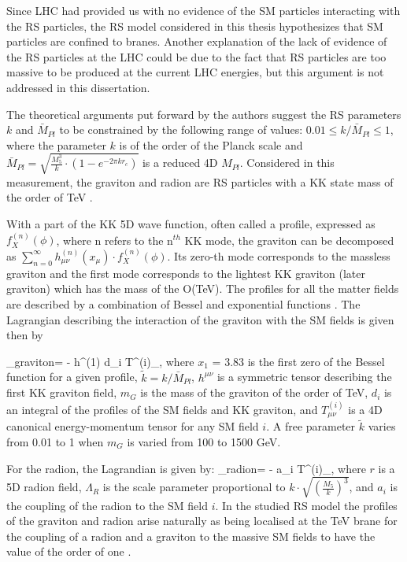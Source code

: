 Since LHC had provided us with no evidence of the SM particles interacting with the RS particles, the RS model considered in this thesis hypothesizes that SM particles are confined to branes. Another explanation of the lack of evidence of the RS particles at the LHC could be due to the fact that RS particles are too massive to be produced at the current LHC energies, but this argument is not addressed in this dissertation. 


The theoretical arguments put forward by the authors \cite{Davoudiasl:1999jd} suggest the RS parameters $k$ and $\bar{M}_{Pl}$ to be constrained by the following range of values: $0.01 \leq k / \bar{M}_{Pl} \leq 1$, where the parameter $k$ is of the order of the Planck scale and $\bar{M}_{Pl} = \sqrt{\frac{M^3_5}{k} \cdot (1 - e^{-2\pi k r_c} ) }$ is a reduced 4D $M_{Pl}$. Considered in this measurement, the graviton and radion are RS particles with a KK state mass of the order of TeV \cite{Oliveira:2014kla}. 

With a part of the KK 5D wave function, often called a profile, expressed as $f^{(n)}_X(\phi)$, where n refers to the n$^{th}$ KK mode, the graviton can be decomposed as $\sum_{n=0}^{\infty} h^{(n)}_{\mu\nu}(x_\mu) \cdot f^{(n)}_X(\phi)$. Its zero-th mode corresponds to the massless graviton and the first mode corresponds to the lightest KK graviton (later graviton) which has the mass of the O(TeV). The profiles for all the matter fields are described by a combination of Bessel and exponential functions \cite{Traczyk:2002jh, Goldberger:1999wh,Raychaudhuri:2126967}. The Lagrangian describing the interaction of the graviton with the SM fields is given then by 

\beqn\label{lagr_graviton}
\Lagr_{graviton}=  -  h^{\mu\nu(1)} \times d_i T^{(i)}_{\mu\nu},  
\eeqn
where $x_1$ = 3.83 is the first zero of the Bessel function for a given profile, $\tilde{k}  = k / \bar{M}_{Pl}$, $h^{\mu\nu}$ is a symmetric tensor describing the first KK graviton field, $m_G$ is the mass of the graviton of the order of TeV, $d_i$ is an integral of the profiles of the SM fields and KK graviton, and  $T^{(i)}_{\mu\nu}$ is a 4D canonical energy-momentum tensor \cite{Forger:2003ut} for any SM field $i$. A free parameter $\tilde{k}$ varies from 0.01 to 1 when $m_{G}$ is varied from 100 to 1500 GeV. 

For the radion, the Lagrandian is given by:
\beqn\label{lagr_radion}
\Lagr_{radion}=  -  \times a_i T^{\mu (i)}_{\mu},  
\eeqn
where $r$ is a 5D radion field, $\Lambda_R$ is the scale parameter proportional to $k \cdot \sqrt{ ( \frac{M_5}{k} )^3}$, and $a_i$ is the coupling of the radion to the SM field $i$. In the studied RS model the profiles of the graviton and radion arise naturally as being localised at the TeV brane for the coupling of a radion and a graviton to the massive SM fields to have the value of the order of one \cite{WED}. 


